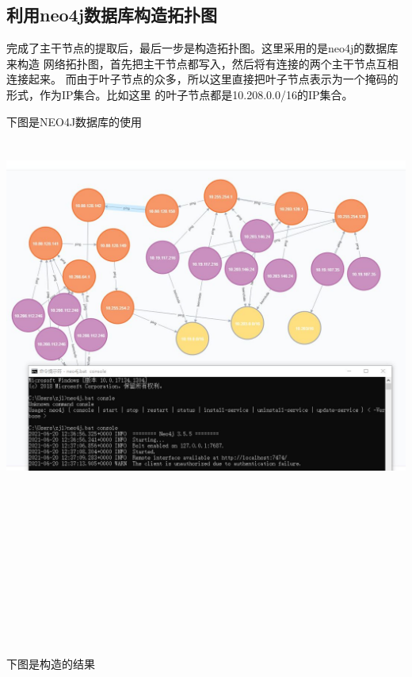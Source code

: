\documentclass{article} %
\begin{document}
        \subsection{\Large 利用neo4j数据库构造拓扑图}
        \par 完成了主干节点的提取后，最后一步是构造拓扑图。这里采用的是neo4j的数据库来构造
        网络拓扑图，首先把主干节点都写入，然后将有连接的两个主干节点互相连接起来。
        而由于叶子节点的众多，所以这里直接把叶子节点表示为一个掩码的形式，作为IP集合。比如这里
        的叶子节点都是10.208.0.0/16的IP集合。
        \\
        \par 下图是NEO4J数据库的使用\\
        \\
        \\
        \includegraphics[scale=0.5]{pic/neo4j数据库.JPG}
        \\
        \\
        \\
        \\
        \\
        \\
        \\
        \\
        \\
        \\
        \\
        \\
        \par 下图是构造的结果\\
        \\
\end{document}

